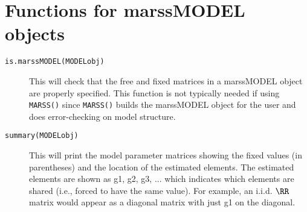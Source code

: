 \section{Functions for marssMODEL objects}
\begin{description}	
		\item[\texttt{is.marssMODEL(MODELobj)}] This will check that the free and fixed matrices in a marssMODEL object are properly specified.  This function is not typically needed if using \texttt{MARSS()} since \texttt{MARSS()} builds the marssMODEL object for the user and does error-checking on model structure.
		\item[\texttt{summary(MODELobj)}] This will print the model parameter matrices showing the fixed values (in parentheses) and the location of the estimated elements.  The estimated elements are shown as g1, g2, g3, ... which indicates which elements are shared (i.e., forced to have the same value).  For example, an i.i.d. $\RR$ matrix would appear as a diagonal matrix with just g1 on the diagonal.
\end{description}
